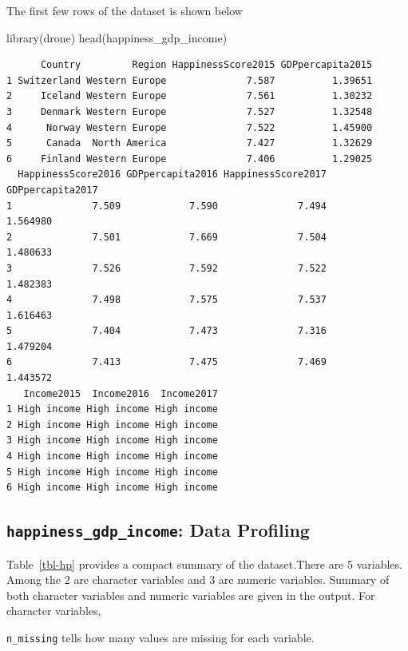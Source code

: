 \documentclass[
  letterpaper,
  DIV=11,
  numbers=noendperiod]{scrreprt}
\newenvironment{Shaded}{\begin{snugshade}}{\end{snugshade}}
\newcommand{\FunctionTok}[1]{\textcolor[rgb]{0.28,0.35,0.67}{#1}}
\newcommand{\NormalTok}[1]{\textcolor[rgb]{0.00,0.23,0.31}{#1}}
\begin{document}
The first few rows of the dataset is shown below

\begin{Shaded}
\begin{Highlighting}[]
\FunctionTok{library}\NormalTok{(drone)}
\FunctionTok{head}\NormalTok{(happiness\_gdp\_income)}
\end{Highlighting}
\end{Shaded}

\begin{verbatim}
      Country         Region HappinessScore2015 GDPpercapita2015
1 Switzerland Western Europe              7.587          1.39651
2     Iceland Western Europe              7.561          1.30232
3     Denmark Western Europe              7.527          1.32548
4      Norway Western Europe              7.522          1.45900
5      Canada  North America              7.427          1.32629
6     Finland Western Europe              7.406          1.29025
  HappinessScore2016 GDPpercapita2016 HappinessScore2017 GDPpercapita2017
1              7.509            7.590              7.494         1.564980
2              7.501            7.669              7.504         1.480633
3              7.526            7.592              7.522         1.482383
4              7.498            7.575              7.537         1.616463
5              7.404            7.473              7.316         1.479204
6              7.413            7.475              7.469         1.443572
   Income2015  Income2016  Income2017
1 High income High income High income
2 High income High income High income
3 High income High income High income
4 High income High income High income
5 High income High income High income
6 High income High income High income
\end{verbatim}

\subsection*{\texorpdfstring{\texttt{happiness\_gdp\_income}: Data
Profiling}{happiness\_gdp\_income: Data Profiling}}\label{happiness_gdp_income-data-profiling}

Table~\ref{tbl-hp} provides a compact summary of the dataset.There are 5
variables. Among the 2 are character variables and 3 are numeric
variables. Summary of both character variables and numeric variables are
given in the output. For character variables,

\texttt{n\_missing} tells how many values are missing for each variable.
\end{document}
